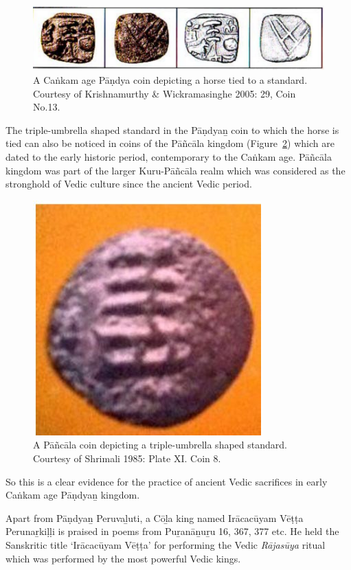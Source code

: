 \begin{figure}[!htbp]
\includegraphics{"images/article-05/art05-fig01.jpg"}
\caption{A Caṅkam age Pāṇdya coin depicting a horse tied to a standard. Courtesy of Krishnamurthy \& Wickramasinghe 2005: 29, Coin No.13.}\label{art5-fig1}
\end{figure}

The triple-umbrella shaped standard in the Pāṇdyaṉ coin to which the horse is tied can also be noticed in coins of the Pāñcāla kingdom (Figure~\ref{art5-fig2}) which are dated to the early historic period, contemporary to the Caṅkam age. Pāñcāla kingdom was part of the larger Kuru-Pāñcāla realm which was considered as the stronghold of Vedic culture since the ancient Vedic period.

\begin{figure}[!htbp]
\includegraphics{"images/article-05/art05-fig02.jpg"}
\caption{ A Pāñcāla coin depicting a triple-umbrella shaped standard. Courtesy of Shrimali 1985: Plate XI. Coin 8.}\label{art5-fig2}
\end{figure}

So this is a clear evidence for the practice of ancient Vedic sacrifices in early Caṅkam age Pāṇdyaṉ kingdom.

Apart from Pāṇdyaṉ Peruvaḻuti, a Cōḻa king named Irācacūyam Vēṭṭa Perunaṟkiḷḷi is praised in poems from Puṟanāṉuṟu 16, 367, 377 etc. He held the Sanskritic title ‘Irācacūyam Vēṭṭa’ for performing the Vedic \textit{Rājasūya} ritual which was performed by the most powerful Vedic kings.

